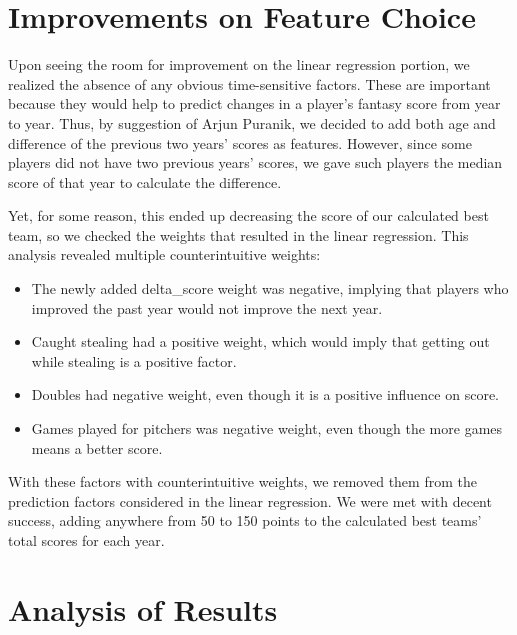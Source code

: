 \documentclass[12pt]{amsart}
\begin{document}
\section{\large Improvements on Feature Choice}
Upon seeing the room for improvement on the linear regression portion, we realized the absence of any obvious time-sensitive factors. These are important because they would help to predict changes in a player's fantasy score from year to year. Thus, by suggestion of Arjun Puranik, we decided to add both age and difference of the previous two years' scores as features. However, since some players did not have two previous years' scores, we gave such players the median score of that year to calculate the difference. 

Yet, for some reason, this ended up decreasing the score of our calculated best team, so we checked the weights that resulted in the linear regression. This analysis revealed multiple counterintuitive weights:
\begin{itemize}
	\item The newly added delta\_score weight was negative, implying that players who improved the past year would not improve the next year. \\
	\item Caught stealing had a positive weight, which would imply that getting out while stealing is a positive factor. \\
	\item Doubles had negative weight, even though it is a positive influence on score.\\
	\item Games played for pitchers was negative weight, even though the more games means a better score.
\end{itemize}
With these factors with counterintuitive weights, we removed them from the prediction factors considered in the linear regression. We were met with decent success, adding anywhere from 50 to 150 points to the calculated best teams' total scores for each year.
\section{\large Analysis of Results}
\end{document}
